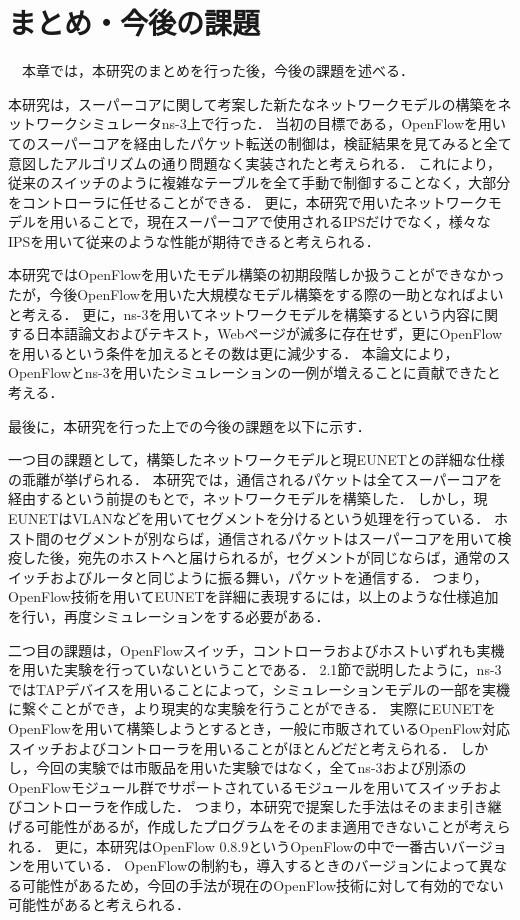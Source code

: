 \chapter{まとめ・今後の課題}

　本章では，本研究のまとめを行った後，今後の課題を述べる．

本研究は，スーパーコアに関して考案した新たなネットワークモデルの構築をネットワークシミュレータns-3上で行った．
当初の目標である，OpenFlowを用いてのスーパーコアを経由したパケット転送の制御は，検証結果を見てみると全て意図したアルゴリズムの通り問題なく実装されたと考えられる．
これにより，従来のスイッチのように複雑なテーブルを全て手動で制御することなく，大部分をコントローラに任せることができる．
更に，本研究で用いたネットワークモデルを用いることで，現在スーパーコアで使用されるIPSだけでなく，様々なIPSを用いて従来のような性能が期待できると考えられる．

本研究ではOpenFlowを用いたモデル構築の初期段階しか扱うことができなかったが，今後OpenFlowを用いた大規模なモデル構築をする際の一助となればよいと考える．
更に，ns-3を用いてネットワークモデルを構築するという内容に関する日本語論文およびテキスト，Webページが滅多に存在せず，更にOpenFlowを用いるという条件を加えるとその数は更に減少する．
本論文により，OpenFlowとns-3を用いたシミュレーションの一例が増えることに貢献できたと考える．

最後に，本研究を行った上での今後の課題を以下に示す．

一つ目の課題として，構築したネットワークモデルと現EUNETとの詳細な仕様の乖離が挙げられる．
本研究では，通信されるパケットは全てスーパーコアを経由するという前提のもとで，ネットワークモデルを構築した．
しかし，現EUNETはVLANなどを用いてセグメントを分けるという処理を行っている．
ホスト間のセグメントが別ならば，通信されるパケットはスーパーコアを用いて検疫した後，宛先のホストへと届けられるが，セグメントが同じならば，通常のスイッチおよびルータと同じように振る舞い，パケットを通信する．
つまり，OpenFlow技術を用いてEUNETを詳細に表現するには，以上のような仕様追加を行い，再度シミュレーションをする必要がある．

二つ目の課題は，OpenFlowスイッチ，コントローラおよびホストいずれも実機を用いた実験を行っていないということである．
2.1節で説明したように，ns-3ではTAPデバイスを用いることによって，シミュレーションモデルの一部を実機に繋ぐことができ，より現実的な実験を行うことができる．
実際にEUNETをOpenFlowを用いて構築しようとするとき，一般に市販されているOpenFlow対応スイッチおよびコントローラを用いることがほとんどだと考えられる．
しかし，今回の実験では市販品を用いた実験ではなく，全てns-3および別添のOpenFlowモジュール群でサポートされているモジュールを用いてスイッチおよびコントローラを作成した．
つまり，本研究で提案した手法はそのまま引き継げる可能性があるが，作成したプログラムをそのまま適用できないことが考えられる．
更に，本研究はOpenFlow 0.8.9というOpenFlowの中で一番古いバージョンを用いている．
OpenFlowの制約も，導入するときのバージョンによって異なる可能性があるため，今回の手法が現在のOpenFlow技術に対して有効的でない可能性があると考えられる．
